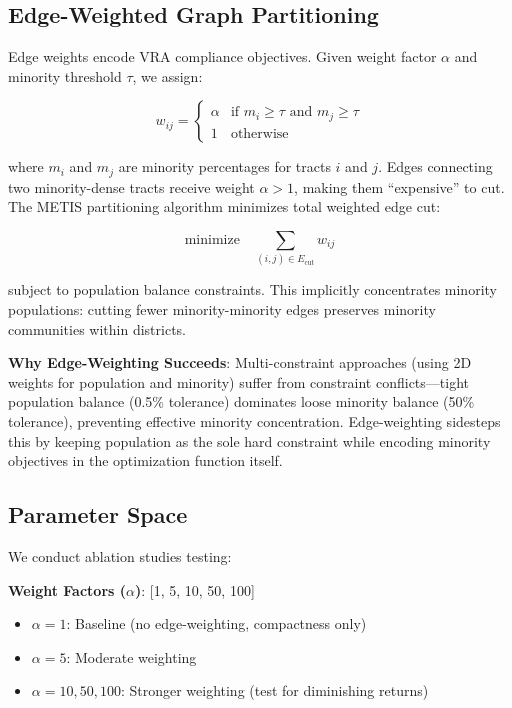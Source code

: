 \subsection{Edge-Weighted Graph Partitioning}

Edge weights encode VRA compliance objectives. Given weight factor $\alpha$ and minority threshold $\tau$, we assign:

\begin{equation}
w_{ij} = \begin{cases}
\alpha & \text{if } m_i \geq \tau \text{ and } m_j \geq \tau \\
1 & \text{otherwise}
\end{cases}
\end{equation}

where $m_i$ and $m_j$ are minority percentages for tracts $i$ and $j$. Edges connecting two minority-dense tracts receive weight $\alpha > 1$, making them ``expensive'' to cut. The METIS partitioning algorithm \citep{karypis1998} minimizes total weighted edge cut:

\begin{equation}
\text{minimize} \quad \sum_{(i,j) \in E_{\text{cut}}} w_{ij}
\end{equation}

subject to population balance constraints. This implicitly concentrates minority populations: cutting fewer minority-minority edges preserves minority communities within districts.

\textbf{Why Edge-Weighting Succeeds}: Multi-constraint approaches (using 2D weights for population and minority) suffer from constraint conflicts—tight population balance (0.5\% tolerance) dominates loose minority balance (50\% tolerance), preventing effective minority concentration. Edge-weighting sidesteps this by keeping population as the sole hard constraint while encoding minority objectives in the optimization function itself.

\subsection{Parameter Space}

We conduct ablation studies testing:

\textbf{Weight Factors ($\alpha$)}: [1, 5, 10, 50, 100]
\begin{itemize}
\item $\alpha = 1$: Baseline (no edge-weighting, compactness only)
\item $\alpha = 5$: Moderate weighting
\item $\alpha = 10, 50, 100$: Stronger weighting (test for diminishing returns)
\end{itemize}


